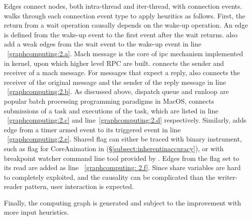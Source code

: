 Edges connect nodes, both intra-thread and iter-thread, with connection events.
\xxx walks through each connection event type to apply heuritics as follows.
First, the return from a wait operation causally depends on the wake-up
operation. An edge is defined from the wake-up event to the first event after
the wait returns. \xxx also add a weak edges from the wait event to the wake-up
event in line ~\ref{graphcomputing:2.a}. Mach message is the core of ipc
mechanism implemented in kernel, upon which higher level RPC are built. \xxx
connects the sender and receiver of a mach message. For messages that expect a
reply, \xxx also connects the receiver of the original message and the sender
of the reply message in line ~\ref{graphcomputing:2.b}. As discussed above,
dispatch queue and runloop are popular batch processing programming paradigms
in MacOS, \xxx connects submissions of a task and executions of the task, which
are listed in line ~\ref{graphcomputing:2.c} and line~\ref{graphcomputing:2.d}
respectively. Similarly, \xxx adds edge from a timer armed event to its
triggered event in line ~\ref{graphcomputing:2.e}. Shared flag can either be
traced with binary instrument, such as  flag for CoreAnimation
in (\S\ref{subsect:inherentinaccuracy}), or with breakpoint watcher command
line tool provided by \xxx. Edges from the flag set to its read are added as
line ~\ref{graphcomputing: 2.f}. Since share variables are hard to completely
exploited, and the causality can be complicated than the writer-reader pattern,
user interaction is expected.

Finally, the computing graph is generated and subject to the improvement with
more input heuristics.

